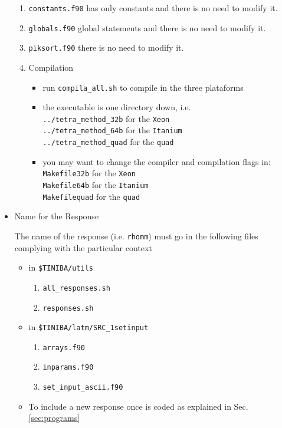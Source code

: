 \documentclass[openany,oneside]{book}
\numberwithin{equation}{section}
\begin{document}
\begin{itemize}
\begin{enumerate}
\item \verb=constants.f90= has only constants and there is no need to
modify it.
\item \verb=globals.f90= global statements and there is no need to
modify it.
\item \verb=piksort.f90= there is no need to
modify it.
\item Compilation
\begin{itemize}
\item run \verb=compila_all.sh= to compile in the three plataforms
\item the executable is one directory down, i.e.\\
\verb=../tetra_method_32b= for the \verb=Xeon=\\
\verb=../tetra_method_64b= for the \verb=Itanium=\\
\verb=../tetra_method_quad= for the \verb=quad=
\item you may want to change the compiler and compilation flags in:\\
\verb=Makefile32b= for the \verb=Xeon=\\
\verb=Makefile64b= for the \verb=Itanium=\\
\verb=Makefilequad= for the \verb=quad=
\end{itemize}

\end{enumerate}

\item Name for the Response

The name of the response (i.e. \verb=rhomm=)
 must go in the following files complying with the particular context 
\begin{itemize}
\item in \verb=$TINIBA/utils=
\begin{enumerate}
\item \verb=all_responses.sh=
\item \verb=responses.sh=
\end{enumerate}
\item in \verb=$TINIBA/latm/SRC_1setinput=
\begin{enumerate}
\item \verb=arrays.f90=
\item \verb=inparams.f90=
\item \verb=set_input_ascii.f90=
\end{enumerate}
\item To include a new response once is coded as explained in
 Sec. \ref{sec:programs} 


\end{itemize}
\end{itemize}
\end{document}
